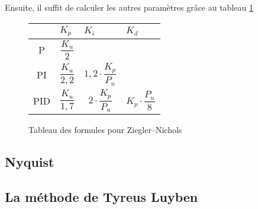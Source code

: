 Ensuite, il suffit de calculer les autres paramètres grâce au tableau \ref{tab:ZieglerNicholsTuningFormulas}

\def\tabularxcolumn#1{m{#1}}
\begin{figure}[ht]
	\begin{center}
		\begin{tabularx}{\textwidth}{| c | X | X | X |}
			\hline
			& $K_p$ & $K_i$ & $K_d$\\ \hline
			P & \begin{equation*}\frac{K_u}{2}\end{equation*} & &\\ \hline
			PI & \begin{equation*}\frac{K_u}{2,2}\end{equation*} & \begin{equation*}1,2 \cdot \frac{K_p}{P_u}\end{equation*} &\\ \hline
			PID & \begin{equation*}\frac{K_u}{1,7}\end{equation*} & \begin{equation*}2 \cdot \frac{K_p}{P_u}\end{equation*} & \begin{equation*}K_p \cdot \frac{P_u}{8}\end{equation*} \\
			\hline
		\end{tabularx}
	\end{center}
	\caption{Tableau des formules pour Ziegler–Nichols}
	\label{tab:ZieglerNicholsTuningFormulas}
\end{figure}

\subsection{Nyquist}

\subsection{La méthode de Tyreus Luyben}
